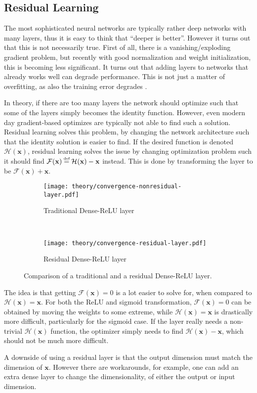 \clearpage
\subsection{Residual Learning}

The most sophisticated neural networks are typically rather deep networks with many layers, thus it is easy to think that ``deeper is better''. However it turns out that this is not necessarily true. First of all, there is a vanishing/exploding gradient problem, but recently with good normalization and weight initialization, this is becoming less significant. It turns out that adding layers to networks that already works well can degrade performance. This is not just a matter of overfitting, as also the training error degrades \cite{residual-learning}.

In theory, if there are too many layers the network should optimize such that some of the layers simply becomes the identity function. However, even modern day gradient-based optimizes are typically not able to find such a solution. Residual learning solves this problem, by changing the network architecture such that the identity solution is easier to find. If the desired function is denoted $\mathcal{H}(\mathbf{x})$, residual learning solves the issue by changing optimization problem such it should find $\mathcal{F}(\mathbf{x}) \defeq \mathcal{H}(\mathbf{x}) - \mathbf{x}$ instead. This is done by transforming the layer to be $\mathcal{F}(\mathbf{x}) + \mathbf{x}$.

\begin{figure}[H]
    \centering
    \begin{subfigure}[b]{0.4\textwidth}
        \centering
        \texttt{[image: theory/convergence-nonresidual-layer.pdf]}
        \caption{Traditional Dense-ReLU layer}
    \end{subfigure}
    ~ %
    \begin{subfigure}[b]{0.4\textwidth}
        \centering
        \texttt{[image: theory/convergence-residual-layer.pdf]}
        \caption{Residual Dense-ReLU layer}
    \end{subfigure}
    \caption{Comparison of a traditional and a residual Dense-ReLU layer.}
\end{figure}

The idea is that getting $\mathcal{F}(\mathbf{x}) = 0$ is a lot easier to solve for, when compared to $\mathcal{H}(\mathbf{x}) = \mathbf{x}$. For both the ReLU and sigmoid transformation, $\mathcal{F}(\mathbf{x}) = 0$ can be obtained by moving the weights to some extreme, while $\mathcal{H}(\mathbf{x}) = \mathbf{x}$ is drastically more difficult, particularly for the sigmoid case. If the layer really needs a non-trivial $\mathcal{H}(\mathbf{x})$ function, the optimizer simply needs to find $\mathcal{H}(\mathbf{x}) - \mathbf{x}$, which should not be much more difficult.

A downside of using a residual layer is that the output dimension must match the dimension of $\mathbf{x}$. However there are workarounds, for example, one can add an extra dense layer to change the dimensionality, of either the output or input dimension.
